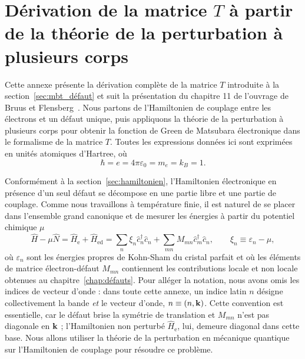 \chapter{Dérivation de la matrice $T$ à partir de la théorie de la perturbation à plusieurs corps}\label{annexe:défauts}

Cette annexe présente la dérivation complète de la matrice $T$ introduite à la section~\ref{sec:mbt_défaut} et suit la présentation du chapitre 11 de l'ouvrage de Bruus et Flensberg~\cite{bruusManyBodyQuantumTheory2004}. Nous partons de l'Hamiltonien de couplage entre les électrons et un défaut unique, puis appliquons la théorie de la perturbation à plusieurs corps pour obtenir la fonction de Green de Matsubara électronique dans le formalisme de la matrice $T$. Toutes les expressions données ici sont exprimées en unités atomiques d'Hartree, où
\begin{equation}
    \hbar = e = 4\pi\varepsilon_0 = m_e = k_B = 1.
    \label{eqn:ad_unités_hartree}
\end{equation}

Conformément à la section~\ref{sec:hamiltonien}, l'Hamiltonien électronique en présence d'un seul défaut se décompose en une partie libre et une partie de couplage. Comme nous travaillons à température finie, il est naturel de se placer dans l'ensemble grand canonique et de mesurer les énergies à partir du potentiel chimique $\mu$
\begin{equation}
    \hat{H}-\mu\hat{N} = \hat{H}_\text{e}+\hat{H}_\text{ed} = \sum_{n}\xi_{n}\hat{c}^\dag_{n}\hat{c}_{n}+\sum_{mn}M_{mn}\hat{c}^\dag_{m}\hat{c}_{n},\qquad \xi_n\equiv\varepsilon_n-\mu,
    \label{eqn:ad_hamiltonien}
\end{equation}
où $\varepsilon_{n}$ sont les énergies propres de Kohn-Sham du cristal parfait et où les éléments de matrice électron-défaut $M_{mn}$ contiennent les contributions locale et non locale obtenues au chapitre~\ref{chap:défauts}. Pour alléger la notation, nous avons omis les indices de vecteur d'onde : dans toute cette annexe, un indice latin $n$ désigne collectivement la bande \emph{et} le vecteur d'onde, $n\equiv(n,\mathbf{k})$. Cette convention est essentielle, car le défaut brise la symétrie de translation et $M_{mn}$ n'est pas diagonale en $\mathbf{k}$ ; l'Hamiltonien non perturbé $\hat{H}_\text{e}$, lui, demeure diagonal dans cette base. Nous allons utiliser la théorie de la perturbation en mécanique quantique sur l'Hamiltonien de couplage pour résoudre ce problème.

